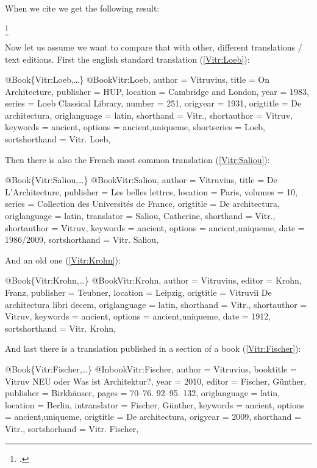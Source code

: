 \documentclass[a4paper,
10pt,
greek,
french,
spanish,
italian,
ngerman,
english
]{ltxdoc}
\begin{document}
When we cite \citeauthor{Vitr} we get the following result:
\begin{example}
\footnote{\cite[1,1,2]{Vitr}.}
\end{example}
Now let us assume we want to compare that with other, different translations / text editions. 
First the english standard translation (\cref{Vitr:Loeb}):
\begin{bibexample}[label=Vitr:Loeb]{{@}Book\{Vitr:Loeb,…\}}
@Book{Vitr:Loeb,
  author        = {Vitruvius},
  title         = {On Architecture},
  publisher     = HUP, %
  location      = {Cambridge and London},
  year          = {1983},
  series        = {Loeb Classical Library},
  number        = {251},
  origyear      = {1931},
  origtitle     = {De architectura},
  origlanguage  = {latin},
  shorthand     = {Vitr.},
  shortauthor   = {Vitruv},
  keywords      = {ancient},
  options       = {ancient,uniqueme},
  shortseries   = {Loeb},
  sortshorthand = {Vitr. Loeb},
}
\end{bibexample}
Then there is also the French most common translation (\cref{Vitr:Saliou}):
\begin{bibexample}[label=Vitr:Saliou]{{@}Book\{Vitr:Saliou,…\}}
@Book{Vitr:Saliou,
  author        = {Vitruvius},
  title         = {De L'Architecture},
  publisher     = {Les belles lettres},
  location      = Paris, %
  volumes        = {10},
  series        = {Collection des Universités de France},
  origtitle     = {De architectura},
  origlanguage  = {latin},
  translator    = {Saliou, Catherine},
  shorthand     = {Vitr.},
  shortauthor   = {Vitruv},
  keywords      = {ancient},
  options       = {ancient,uniqueme},
  date          = {1986/2009},
  sortshorthand = {Vitr. Saliou},
}
\end{bibexample}
And an old one (\cref{Vitr:Krohn}):
\begin{bibexample}[label=Vitr:Krohn]{{@}Book\{Vitr:Krohn,…\}}
@Book{Vitr:Krohn,
  author        = {Vitruvius},
  editor        = {Krohn, Franz},
  publisher     = {Teubner},
  location      = Leipzig, %
  origtitle     = {Vitruvii De architectura libri decem},
  origlanguage  = {latin},
  shorthand     = {Vitr.},
  shortauthor   = {Vitruv},
  keywords      = {ancient},
  options       = {ancient,uniqueme},
  date          = {1912},
  sortshorthand = {Vitr. Krohn},
}
\end{bibexample}

And last there is a translation published in a section of a book (\cref{Vitr:Fischer}):
\begin{bibexample}[label=Vitr:Fischer]{{@}Book\{Vitr:Fischer,…\}}
@Inbook{Vitr:Fischer,
  author       = {Vitruvius},
  booktitle    = {Vitruv NEU oder Was ist Architektur?},
  year         = {2010},
  editor       = {Fischer, Günther},
  publisher    = {Birkhäuser},
  pages        = {70--76. 92--95. 132\psq},
  origlanguage = {latin},
  location     = Berlin, %
  intranslator = {Fischer, Günther},
  keywords     = {ancient},
  options      = {ancient,uniqueme},
  origtitle    = {De architectura},
  origyear     = {2009},
  shorthand    = {Vitr.},
  sortshorhand = {Vitr. Fischer},
}
\end{bibexample}
\end{document}

